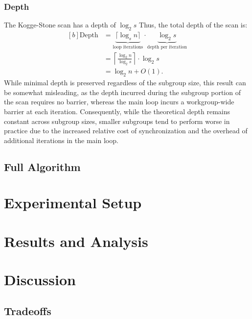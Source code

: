 \documentclass[sigconf]{acmart}
\begin{document}
\subsubsection{Depth}
The Kogge-Stone scan has a depth of $\log_2 s$ Thus, the total depth of the scan is:
\begin{equation}
  \begin{aligned}[b]
    \text{Depth} & = \underbrace{\lceil \log_s n \rceil}_{\text{loop iterations}}
    \cdot \underbrace{\log_2 s}_{\text{depth per iteration}}                           \\
                 & = \left\lceil \frac{\log_2 n}{\log_2 s} \right\rceil \cdot \log_2 s \\
                 & = \log_2 n + O(1).
  \end{aligned}
\end{equation}
While minimal depth is preserved regardless of the subgroup size, this result can be somewhat misleading, as the depth incurred during the subgroup portion of the scan requires no barrier, whereas the main loop incurs a workgroup-wide barrier at each iteration. Consequently, while the theoretical depth remains constant across subgroup sizes, smaller subgroups tend to perform worse in practice due to the increased relative cost of synchronization and the overhead of additional iterations in the main loop.
\subsection{Full Algorithm}

\section{Experimental Setup}

\section{Results and Analysis}

\section{Discussion}

\subsection{Tradeoffs}
\end{document}
